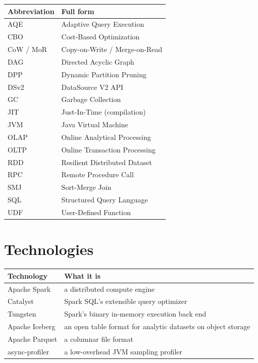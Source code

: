 \begin{table}[H]
\centering
\footnotesize
\renewcommand{\arraystretch}{0.9}
\begin{tabular}{@{}P{3.2cm}P{10.7cm}@{}}
\toprule
\textbf{Abbreviation} & \textbf{Full form} \\
\midrule
AQE & Adaptive Query Execution \\
CBO & Cost-Based Optimization \\
CoW / MoR & Copy-on-Write / Merge-on-Read \\
DAG & Directed Acyclic Graph \\
DPP & Dynamic Partition Pruning \\
DSv2 & DataSource V2 API \\
GC & Garbage Collection \\
JIT & Just-In-Time (compilation) \\
JVM & Java Virtual Machine \\
OLAP & Online Analytical Processing \\
OLTP & Online Transaction Processing \\
RDD & Resilient Distributed Dataset \\
RPC & Remote Procedure Call \\
SMJ & Sort-Merge Join \\
SQL & Structured Query Language \\
UDF & User-Defined Function \\
\bottomrule
\end{tabular}
\end{table}

\section*{Technologies}

\begin{table}[H]
\centering
\footnotesize
\renewcommand{\arraystretch}{0.9}
\begin{tabular}{@{}P{3.6cm}P{10.1cm}@{}}
\toprule
\textbf{Technology} & \textbf{What it is} \\
\midrule
Apache Spark & a distributed compute engine \\
Catalyst & Spark SQL's extensible query optimizer \\
Tungsten & Spark's binary in-memory execution back end \\
Apache Iceberg & an open table format for analytic datasets on object storage \\
Apache Parquet & a columnar file format \\
async-profiler & a low-overhead JVM sampling profiler \\
\bottomrule
\end{tabular}
\end{table}
